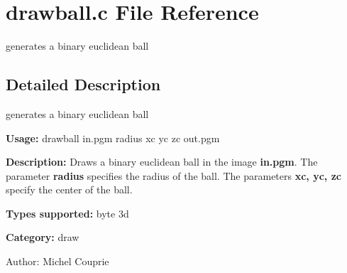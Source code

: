 \section{drawball.c File Reference}
\label{drawball_8c}
generates a binary euclidean ball 



\subsection{Detailed Description}
generates a binary euclidean ball 

{\bf Usage:} drawball in.pgm radius xc yc zc out.pgm

{\bf Description:} Draws a binary euclidean ball in the image {\bf in.pgm}. The parameter {\bf radius} specifies the radius of the ball. The parameters {\bf xc, yc, zc} specify the center of the ball.

{\bf Types supported:} byte 3d

{\bf Category:} draw

\begin{Desc}
\item[Author:]Michel Couprie \end{Desc}
